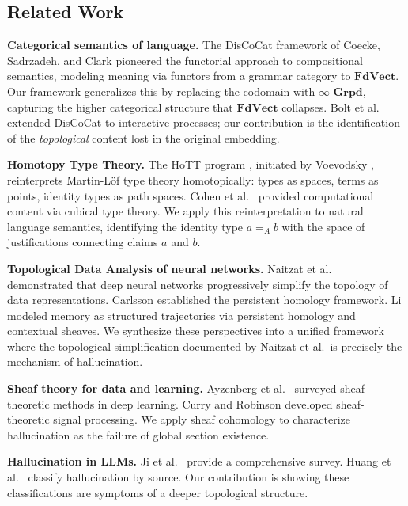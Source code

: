 \documentclass[11pt,a4paper]{article}
\theoremstyle{plain}
\theoremstyle{definition}
\newcommand{\Grpd}{\boldsymbol{\infty}\text{-}\mathbf{Grpd}}
\begin{document}
\subsection{Related Work}

\textbf{Categorical semantics of language.} The DisCoCat framework of Coecke, Sadrzadeh, and Clark \cite{coecke2010mathematical} pioneered the functorial approach to compositional semantics, modeling meaning via functors from a grammar category to $\mathbf{FdVect}$. Our framework generalizes this by replacing the codomain with $\Grpd$, capturing the higher categorical structure that $\mathbf{FdVect}$ collapses. Bolt et al.\ \cite{bolt2019interacting} extended DisCoCat to interactive processes; our contribution is the identification of the \emph{topological} content lost in the original embedding.

\textbf{Homotopy Type Theory.} The HoTT program \cite{hottbook}, initiated by Voevodsky \cite{voevodsky2010univalent}, reinterprets Martin-L\"of type theory homotopically: types as spaces, terms as points, identity types as path spaces. Cohen et al.\ \cite{cohen2018cubical} provided computational content via cubical type theory. We apply this reinterpretation to natural language semantics, identifying the identity type $a =_A b$ with the space of justifications connecting claims $a$ and $b$.

\textbf{Topological Data Analysis of neural networks.} Naitzat et al.\ \cite{naitzat2020topology} demonstrated that deep neural networks progressively simplify the topology of data representations. Carlsson \cite{carlsson2009topology} established the persistent homology framework. Li \cite{li2025memory} modeled memory as structured trajectories via persistent homology and contextual sheaves. We synthesize these perspectives into a unified framework where the topological simplification documented by Naitzat et al.\ is precisely the mechanism of hallucination.

\textbf{Sheaf theory for data and learning.} Ayzenberg et al.\ \cite{ayzenberg2025sheaf} surveyed sheaf-theoretic methods in deep learning. Curry \cite{curry2014sheaves} and Robinson \cite{robinson2014topological} developed sheaf-theoretic signal processing. We apply sheaf cohomology to characterize hallucination as the failure of global section existence.

\textbf{Hallucination in LLMs.} Ji et al.\ \cite{ji2023survey} provide a comprehensive survey. Huang et al.\ \cite{huang2023survey} classify hallucination by source. Our contribution is showing these classifications are symptoms of a deeper topological structure.
\end{document}
